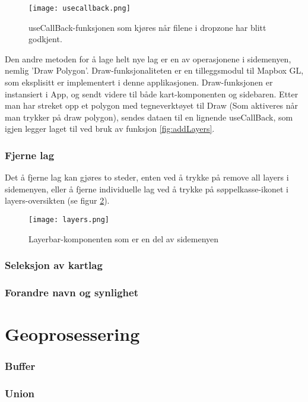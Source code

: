 \begin{figure}[h]
    \center
    \texttt{[image: usecallback.png]}
    \caption{useCallBack-funksjonen som kjøres når filene i dropzone har blitt godkjent.}
    \label{fig:usecallback}
\end{figure}

Den andre metoden for å lage helt nye lag er en av operasjonene i sidemenyen, nemlig 'Draw Polygon'. Draw-funksjonaliteten er en tilleggsmodul til Mapbox GL, som eksplisitt er implementert i denne applikasjonen. Draw-funksjonen er instansiert i App, og sendt videre til både kart-komponenten og sidebaren. Etter man har streket opp et polygon med tegneverktøyet til Draw (Som aktiveres når man trykker på draw polygon), sendes dataen til en lignende useCallBack, som igjen legger laget til ved bruk av funksjon \ref{fig:addLayers}.

\subsubsection{Fjerne lag}

Det å fjerne lag kan gjøres to steder, enten ved å trykke på remove all layers i sidemenyen, eller å fjerne individuelle lag ved å trykke på søppelkasse-ikonet i layers-oversikten (se figur \ref{fig:layerbar}).  

\begin{figure}[h]
    \center
    \texttt{[image: layers.png]}
    \caption{Layerbar-komponenten som er en del av sidemenyen}
    \label{fig:layerbar}
\end{figure}

\subsubsection{Seleksjon av kartlag}

\subsubsection{Forandre navn og synlighet}

\section{Geoprosessering}
\label{sec:geoprosessering}
\subsubsection{Buffer}
\subsubsection{Union}
